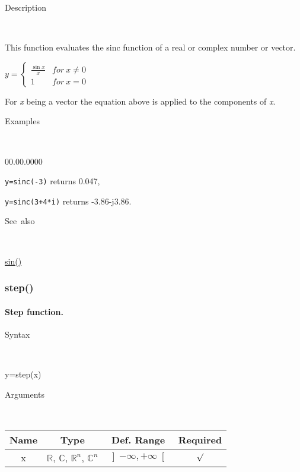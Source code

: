 \begin{description}
\item [Description]~
\end{description}
This function evaluates the sinc function of a real or complex number
or vector.

\medskip{}
$y=\left\{ \begin{array}{cc}
{\displaystyle \frac{\sin x}{x}} & for\: x\neq0\\
1 & for\: x=0\end{array}\right.$
\medskip{}

\noindent For \textit{x} being a vector the equation above is applied
to the components of \textit{x}.

\begin{description}
\item [Examples]~
\end{description}
\begin{lyxlist}{00.00.0000}
\item [\texttt{y=sinc(-3)}]returns 0.047,
\item [\texttt{y=sinc(3+4{*}i)}]returns -3.86-j3.86.
\end{lyxlist}
\begin{description}
\item [See~also]~
\end{description}
\textcolor{blue}{\hyperlink{sin}{sin()}}


\newpage
\subsubsection*{\hypertarget{step}{}{\Large step()}}


\paragraph{\label{par:Step-function}Step function.}

\begin{description}
\item [Syntax]~
\end{description}
y=step(x)

\begin{description}
\item [Arguments]~
\end{description}
\begin{tabular}{|c|c|c|c|}
\hline 
Name&
Type&
Def. Range&
Required\tabularnewline
\hline
\hline 
x&
$\mathbb{R}$, $\mathbb{C}$, $\mathbb{R}^{n}$, $\mathbb{C}^{n}$&
$\left]-\infty,+\infty\right[$&
$\surd$\tabularnewline
\hline
\end{tabular}

